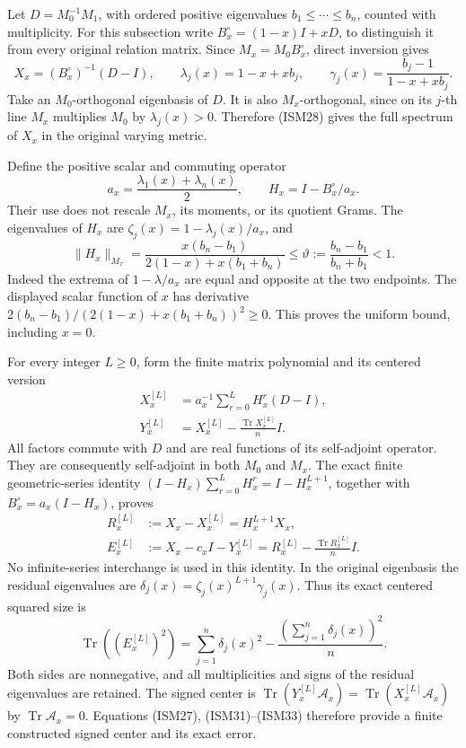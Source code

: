 Let \(D=M_0^{-1}M_1\), with ordered positive eigenvalues
\(b_1\leq\cdots\leq b_n\), counted with multiplicity.
For this subsection write \(B_x^\circ=(1-x)I+xD\),
to distinguish it from every original relation matrix.
Since \(M_x=M_0B_x^\circ\), direct inversion gives
\[
 X_x=(B_x^\circ)^{-1}(D-I),\qquad
 \lambda_j(x)=1-x+xb_j,\qquad
 \gamma_j(x)=\frac{b_j-1}{1-x+xb_j}.
 \tag{ISM28}
\]
Take an \(M_0\)-orthogonal eigenbasis of \(D\).
It is also \(M_x\)-orthogonal, since on its \(j\)-th
line \(M_x\) multiplies \(M_0\) by \(\lambda_j(x)>0\).
Therefore (ISM28) gives the full spectrum of \(X_x\)
in the original varying metric.

Define the positive scalar and commuting operator
\[
 a_x=\frac{\lambda_1(x)+\lambda_n(x)}2,\qquad
 H_x=I-B_x^\circ/a_x.
 \tag{ISM29}
\]
Their use does not rescale \(M_x\), its moments, or
its quotient Grams.  The eigenvalues of \(H_x\) are
\(\zeta_j(x)=1-\lambda_j(x)/a_x\), and
\[
 \|H_x\|_{M_x}
 =\frac{x(b_n-b_1)}{2(1-x)+x(b_1+b_n)}
 \leq\vartheta:=\frac{b_n-b_1}{b_n+b_1}<1.
 \tag{ISM30}
\]
Indeed the extrema of \(1-\lambda/a_x\) are equal
and opposite at the two endpoints.  The displayed
scalar function of \(x\) has derivative
\(2(b_n-b_1)/(2(1-x)+x(b_1+b_n))^2\geq0\).
This proves the uniform bound, including \(x=0\).

For every integer \(L\geq0\), form the finite matrix
polynomial and its centered version
\[
 \begin{split}
 X_x^{[L]}&=a_x^{-1}
        \sum_{r=0}^L H_x^r(D-I),\\
 Y_x^{[L]}&=X_x^{[L]}
               -\frac{\operatorname{Tr}X_x^{[L]}}n I.
 \end{split}
 \tag{ISM31}
\]
All factors commute with \(D\) and are real functions of
its self-adjoint operator.  They are consequently
self-adjoint in both \(M_0\) and \(M_x\).
The exact finite geometric-series identity
\((I-H_x)\sum_{r=0}^L H_x^r=I-H_x^{L+1}\),
together with \(B_x^\circ=a_x(I-H_x)\), proves
\[
 \begin{split}
 R_x^{[L]}&:=X_x-X_x^{[L]}=H_x^{L+1}X_x,\\
 E_x^{[L]}&:=X_x-c_xI-Y_x^{[L]}
     =R_x^{[L]}-\frac{\operatorname{Tr}R_x^{[L]}}n I.
 \end{split}
 \tag{ISM32}
\]
No infinite-series interchange is used in this identity.
In the original eigenbasis the residual eigenvalues
are \(\delta_j(x)=\zeta_j(x)^{L+1}\gamma_j(x)\).
Thus its exact centered squared size is
\[
 \operatorname{Tr}((E_x^{[L]})^2)
   =\sum_{j=1}^n\delta_j(x)^2
       -\frac{(\sum_{j=1}^n\delta_j(x))^2}{n}.
 \tag{ISM33}
\]
Both sides are nonnegative, and all multiplicities
and signs of the residual eigenvalues are retained.
The signed center is
\(\operatorname{Tr}(Y_x^{[L]}\mathcal A_x)
=\operatorname{Tr}(X_x^{[L]}\mathcal A_x)\)
by \(\operatorname{Tr}\mathcal A_x=0\).
Equations (ISM27), (ISM31)--(ISM33) therefore provide
a finite constructed signed center and its exact error.

